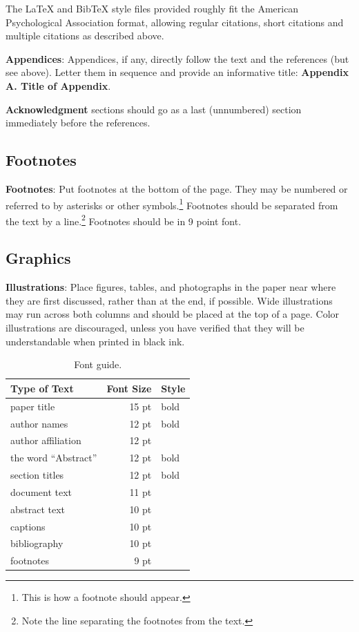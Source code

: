\documentclass[11pt,letterpaper]{article}
\begin{document}
The \LaTeX{} and Bib\TeX{} style files provided roughly fit the
American Psychological Association format, allowing regular citations, 
short citations and multiple citations as described above.

{\bf Appendices}: Appendices, if any, directly follow the text and the
references (but see above).  Letter them in sequence and provide an
informative title: {\bf Appendix A. Title of Appendix}.

\textbf{Acknowledgment} sections should go as a last (unnumbered) section immediately
before the references.  

\subsection{Footnotes}

{\bf Footnotes}: Put footnotes at the bottom of the page. They may
be numbered or referred to by asterisks or other
symbols.\footnote{This is how a footnote should appear.} Footnotes
should be separated from the text by a line.\footnote{Note the
line separating the footnotes from the text.}  Footnotes should be in 9 point font.

\subsection{Graphics}

{\bf Illustrations}: Place figures, tables, and photographs in the
paper near where they are first discussed, rather than at the end, if
possible.  Wide illustrations may run across both columns and should be placed at
the top of a page. Color illustrations are discouraged, unless you have verified that 
they will be understandable when printed in black ink.

\begin{table}
\begin{center}
\begin{tabular}{|l|rl|}
\hline \bf Type of Text & \bf Font Size & \bf Style \\ \hline
paper title & 15 pt & bold \\
author names & 12 pt & bold \\
author affiliation & 12 pt & \\
the word ``Abstract'' & 12 pt & bold \\
section titles & 12 pt & bold \\
document text & 11 pt  &\\
abstract text & 10 pt & \\
captions & 10 pt & \\
bibliography & 10 pt & \\
footnotes & 9 pt & \\
\hline
\end{tabular}
\end{center}
\caption{\label{font-table} Font guide. }
\end{table}
\end{document}
